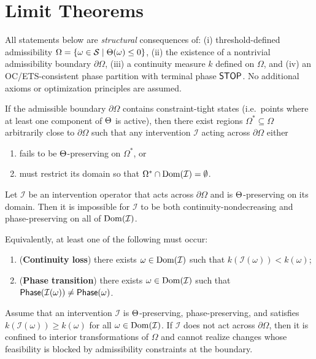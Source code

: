 ﻿\section{Limit Theorems}

All statements below are \emph{structural} consequences of:
(i) threshold-defined admissibility
$\Omega=\{\omega\in\mathcal{S}\mid\Theta(\omega)\le 0\}$,
(ii) the existence of a nontrivial admissibility boundary $\partial\Omega$,
(iii) a continuity measure $k$ defined on $\Omega$, and
(iv) an OC/ETS-consistent phase partition with terminal phase $\mathsf{STOP}$.
No additional axioms or optimization principles are assumed.

\begin{theorem}
\label{thm:saturation}
If the admissible boundary $\partial\Omega$ contains constraint-tight states
(i.e.\ points where at least one component of $\Theta$ is active), then there
exist regions $\Omega^\ast\subseteq\Omega$ arbitrarily close to $\partial\Omega$
such that any intervention $\mathcal{I}$ acting across $\partial\Omega$ either
\begin{enumerate}
\item fails to be $\Theta$-preserving on $\Omega^\ast$, or
\item must restrict its domain so that
$\Omega^\ast\cap\operatorname{Dom}(\mathcal{I})=\emptyset$.
\end{enumerate}
\end{theorem}

\begin{theorem}
\label{thm:no_free}
Let $\mathcal{I}$ be an intervention operator that acts across $\partial\Omega$
and is $\Theta$-preserving on its domain.
Then it is impossible for $\mathcal{I}$ to be both continuity-nondecreasing and
phase-preserving on all of $\operatorname{Dom}(\mathcal{I})$.

Equivalently, at least one of the following must occur:
\begin{enumerate}
\item (\textbf{Continuity loss}) there exists
$\omega\in\operatorname{Dom}(\mathcal{I})$ such that
$k(\mathcal{I}(\omega))<k(\omega)$;
\item (\textbf{Phase transition}) there exists
$\omega\in\operatorname{Dom}(\mathcal{I})$ such that
$\mathsf{Phase}(\mathcal{I}(\omega))\neq\mathsf{Phase}(\omega)$.
\end{enumerate}
\end{theorem}

\begin{proposition}
\label{prop:trivial}
Assume that an intervention $\mathcal{I}$ is $\Theta$-preserving,
phase-preserving, and satisfies
$k(\mathcal{I}(\omega))\ge k(\omega)$ for all
$\omega\in\operatorname{Dom}(\mathcal{I})$.
If $\mathcal{I}$ does not act across $\partial\Omega$, then it is confined to
interior transformations of $\Omega$ and cannot realize changes whose
feasibility is blocked by admissibility constraints at the boundary.
\end{proposition}


